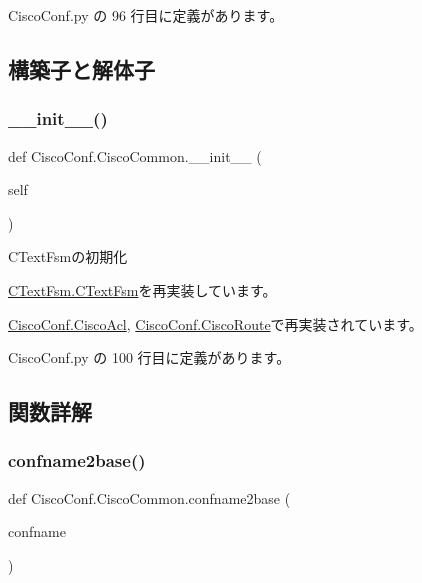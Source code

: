  Cisco\+Conf.\+py の 96 行目に定義があります。



\subsection{構築子と解体子}
\mbox{\label{classCiscoConf_1_1CiscoCommon_a67ee86ca701af50e95bed0abfcd09dda}} 
\subsubsection{\texorpdfstring{\_\_init\_\_()}{\_\_init\_\_()}}
{\footnotesize\ttfamily def Cisco\+Conf.\+Cisco\+Common.\+\_\+\+\_\+init\+\_\+\+\_\+ (\begin{DoxyParamCaption}\item[{}]{self }\end{DoxyParamCaption})}

\begin{DoxyVerb}CTextFsmの初期化
\end{DoxyVerb}
 

\mbox{\hyperlink{classCTextFsm_1_1CTextFsm_ae888a03cec9e1bb808d590dc35a9ec6b}{C\+Text\+Fsm.\+C\+Text\+Fsm}}を再実装しています。



\mbox{\hyperlink{classCiscoConf_1_1CiscoAcl_a84104a6a25dd68d24474d15985702ab6}{Cisco\+Conf.\+Cisco\+Acl}}, \mbox{\hyperlink{classCiscoConf_1_1CiscoRoute_a1f0e3788e7f8459ea9de2f8bd21c1b05}{Cisco\+Conf.\+Cisco\+Route}}で再実装されています。



 Cisco\+Conf.\+py の 100 行目に定義があります。



\subsection{関数詳解}
\mbox{\label{classCiscoConf_1_1CiscoCommon_a8cec30496e624ec5d237f05e09dc344b}} 
\subsubsection{\texorpdfstring{confname2base()}{confname2base()}}
{\footnotesize\ttfamily def Cisco\+Conf.\+Cisco\+Common.\+confname2base (\begin{DoxyParamCaption}\item[{}]{confname }\end{DoxyParamCaption})\hspace{0.3cm}{\ttfamily [static]}}

